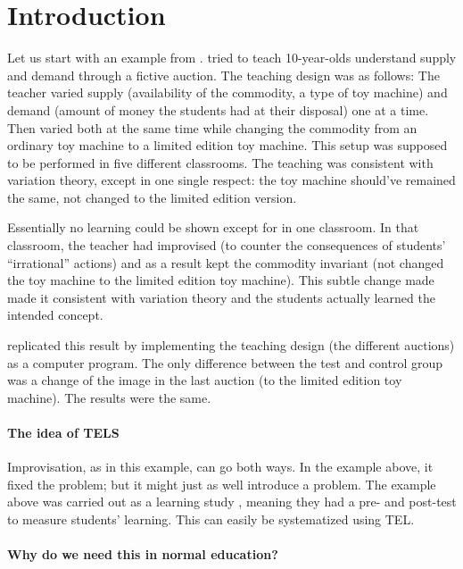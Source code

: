 \mode*

\section{Introduction}

Let us start with an example from \textcite[Ch.~7, 
p.~239]{NecessaryConditionsOfLearning}.
\Textcite{Auction10yo} tried to teach 10-year-olds understand supply and demand 
through a fictive auction.
The teaching design was as follows:
The teacher varied supply (availability of the commodity, a type of toy 
machine) and demand (amount of money the students had at their disposal) one at 
a time.
Then varied both at the same time while changing the commodity from an ordinary 
toy machine to a limited edition toy machine.
This setup was supposed to be performed in five different classrooms.
The teaching was consistent with variation theory, except in one single 
respect:
the toy machine should've remained the same, not changed to the limited edition 
version.

Essentially no learning could be shown except for in one classroom.
In that classroom, the teacher had improvised (to counter the consequences of 
students' \enquote{irrational} actions) and as a result kept the commodity 
invariant (not changed the toy machine to the limited edition toy machine).
This subtle change made made it consistent with variation theory and the 
students actually learned the intended concept.

\Textcite{AuctionReplication} replicated this result by implementing the 
teaching design (the different auctions) as a computer program.
The only difference between the test and control group was a change of the 
image in the last auction (to the limited edition toy machine).
The results were the same.

\paragraph{The idea of \acs*{TELS}}

Improvisation, as in this example, can go both ways.
In the example above, it fixed the problem; but it might just as well introduce 
a problem.
The example above was carried out as a learning study 
\parencite{LearningStudy}, meaning they had a pre- and post-test to measure 
students' learning.
This can easily be systematized using \ac{TEL}.

\paragraph{Why do we need this in normal education?}

